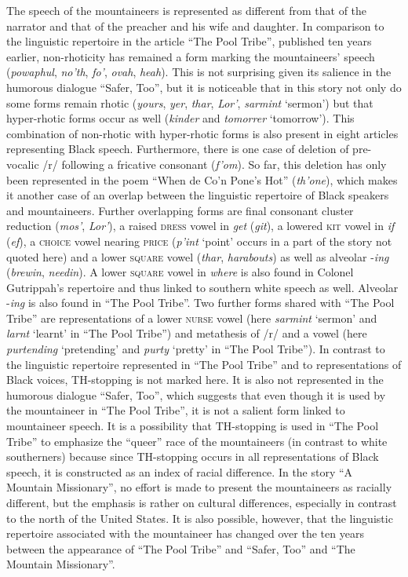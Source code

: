 The speech of the mountaineers is represented as different from that of the narrator and that of the preacher and his wife and daughter. In comparison to the linguistic repertoire in the article “The Pool Tribe”, published ten years earlier, non-rhoticity has remained a form marking the mountaineers’ speech (\emph{powaphul}, \emph{no’th}, \emph{fo’}, \emph{ovah}, \emph{heah}). This is not surprising given its salience in the humorous dialogue “Safer, Too”, but it is noticeable that in this story not only do some forms remain rhotic (\emph{yours}, \emph{yer}, \emph{thar}, \emph{Lor’}, \emph{sarmint} ‘sermon’) but that hyper-rhotic forms occur as well (\emph{kinder} and \emph{tomorrer} ‘tomorrow’). This combination of non-rhotic with hyper-rhotic forms is also present in eight articles representing Black speech. Furthermore, there is one case of deletion of pre-vocalic /r/ following a fricative consonant (\emph{f’om}). So far, this deletion has only been represented in the poem “When de Co’n Pone’s Hot” (\emph{th’one}), which makes it another case of an overlap between the linguistic repertoire of Black speakers and mountaineers. Further overlapping forms are final consonant cluster reduction (\emph{mos’}, \emph{Lor’}), a raised \textsc{dress} vowel in \emph{get} (\emph{git}), a lowered \textsc{kit} vowel in \emph{if} (\emph{ef}), a \textsc{choice} vowel nearing \textsc{price} (\emph{p’int} ‘point’ occurs in a part of the story not quoted here) and a lower \textsc{square} vowel (\emph{thar}, \emph{harabouts}) as well as alveolar -\emph{ing} (\emph{brewin}, \emph{needin}). A lower \textsc{square} vowel in \emph{where} is also found in Colonel Gutrippah’s repertoire and thus linked to southern white speech as well. Alveolar -\emph{ing} is also found in “The Pool Tribe”. Two further forms shared with “The Pool Tribe” are representations of a lower \textsc{nurse} vowel (here \emph{sarmint} ‘sermon’ and \emph{larnt} ‘learnt’ in “The Pool Tribe”) and metathesis of /r/ and a vowel (here \emph{purtending} ‘pretending’ and \emph{purty} ‘pretty’ in “The Pool Tribe”). In contrast to the linguistic repertoire represented in “The Pool Tribe” and to representations of Black voices, TH-stopping is not marked here. It is also not represented in the humorous dialogue “Safer, Too”, which suggests that even though it is used by the mountaineer in “The Pool Tribe”, it is not a salient form linked to mountaineer speech. It is a possibility that TH-stopping is used in “The Pool Tribe” to emphasize the “queer” race of the mountaineers (in contrast to white southerners) because since TH-stopping occurs in all representations of Black speech, it is constructed as an index of racial difference. In the story “A Mountain Missionary”, no effort is made to present the mountaineers as racially different, but the emphasis is rather on cultural differences, especially in contrast to the north of the United States. It is also possible, however, that the linguistic repertoire associated with the mountaineer has changed over the ten years between the appearance of “The Pool Tribe” and “Safer, Too” and “The Mountain Missionary”.

